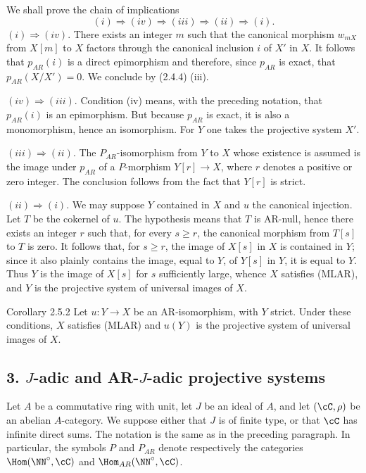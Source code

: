 \begin{prooftext}[Proof]
We shall prove the chain of implications
\[
(i)\Rightarrow(iv)\Rightarrow(iii)\Rightarrow(ii)\Rightarrow(i).
\]
$(i)\Rightarrow(iv)$. There exists an integer $m$ such that the canonical morphism $w_{mX}$ from $X[m]$ to $X$ factors through the canonical inclusion $i$ of $X'$ in $X$. It follows that $p_{AR}(i)$ is a direct epimorphism and therefore, since $p_{AR}$ is exact, that $p_{AR}(X/X')=0$. We conclude by (2.4.4) (iii).

$(iv)\Rightarrow(iii)$. Condition (iv) means, with the preceding notation, that $p_{AR}(i)$ is an epimorphism. But because $p_{AR}$ is exact, it is also a monomorphism, hence an isomorphism. For $Y$ one takes the projective system $X'$.

$(iii)\Rightarrow(ii)$. The $P_{AR}$-isomorphism from $Y$ to $X$ whose existence is assumed is the image under $p_{AR}$ of a $P$-morphism $Y[r]\to X$, where $r$ denotes a positive or zero integer. The conclusion follows from the fact that $Y[r]$ is strict.

$(ii)\Rightarrow(i)$. We may suppose $Y$ contained in $X$ and $u$ the canonical injection. Let $T$ be the cokernel of $u$. The hypothesis means that $T$ is AR-null, hence there exists an integer $r$ such that, for every $s\ge r$, the canonical morphism from $T[s]$ to $T$ is zero. It follows that, for $s\ge r$, the image of $X[s]$ in $X$ is contained in $Y$; since it also plainly contains the image, equal to $Y$, of $Y[s]$ in $Y$, it is equal to $Y$. Thus $Y$ is the image of $X[s]$ for $s$ sufficiently large, whence $X$ satisfies (MLAR), and $Y$ is the projective system of universal images of $X$.
\end{prooftext}

\begin{statement}{Corollary 2.5.2}
Let $u:Y\to X$ be an AR-isomorphism, with $Y$ strict. Under these conditions, $X$ satisfies (MLAR) and $u(Y)$ is the projective system of universal images of $X$.
\end{statement}

\subsection*{3. $J$-adic and AR-$J$-adic projective systems}
Let $A$ be a commutative ring with unit, let $J$ be an ideal of $A$, and let $(\cC,\rho)$ be an abelian $A$-category. We suppose either that $J$ is of finite type, or that $\cC$ has infinite direct sums. The notation is the same as in the preceding paragraph. In particular, the symbols $P$ and $P_{AR}$ denote respectively the categories $\Hom(\NN^\circ,\cC)$ and $\Hom_{AR}(\NN^\circ,\cC)$.

